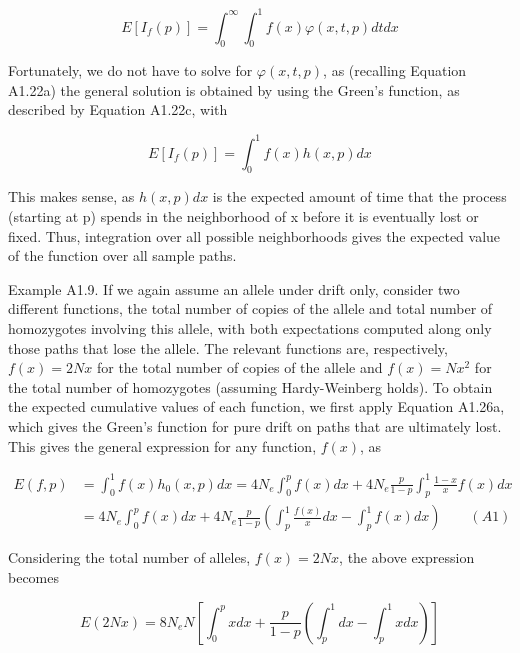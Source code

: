 \documentclass{article}
\begin{document}
\begin{equation}
E[I_{f}(p)]=\int_{0}^{\infty}\int_{0}^{1}f(x)\varphi(x,t,p)dt dx
\end{equation}

Fortunately, we do not have to solve for  $ \varphi(x,t,p) $, as (recalling Equation A1.22a) the general solution is obtained by using the Green's function, as described by Equation A1.22c, with

\begin{equation}
E[I_{f}(p)]=\int_{0}^{1}f(x)h(x,p)dx
\end{equation}

This makes sense, as  $ h(x,p)dx $ is the expected amount of time that the process (starting at p) spends in the neighborhood of x before it is eventually lost or fixed. Thus, integration over all possible neighborhoods gives the expected value of the function over all sample paths.

Example A1.9. If we again assume an allele under drift only, consider two different functions, the total number of copies of the allele and total number of homozygotes involving this allele, with both expectations computed along only those paths that lose the allele. The relevant functions are, respectively,  $ f(x) = 2Nx $ for the total number of copies of the allele and  $ f(x) = Nx^2 $ for the total number of homozygotes (assuming Hardy-Weinberg holds). To obtain the expected cumulative values of each function, we first apply Equation A1.26a, which gives the Green's function for pure drift on paths that are ultimately lost. This gives the general expression for any function,  $ f(x) $, as

\begin{equation}
\begin{aligned}E(f,p)&=\int_{0}^{1}f(x)h_{0}(x,p)dx=4N_{e}\int_{0}^{p}f(x)dx+4N_{e}\frac{p}{1-p}\int_{p}^{1}\frac{1-x}{x}f(x)dx\\&=4N_{e}\int_{0}^{p}f(x)dx+4N_{e}\frac{p}{1-p}\left(\int_{p}^{1}\frac{f(x)}{x}dx-\int_{p}^{1}f(x)dx\right)\qquad(A1)\end{aligned}
\end{equation}

Considering the total number of alleles,  $ f(x) = 2Nx $, the above expression becomes

\begin{equation}
E(2Nx)=8N_{e}N\left[\int_{0}^{p}x dx+\frac{p}{1-p}\left(\int_{p}^{1}dx-\int_{p}^{1}x dx\right)\right]
\end{equation}
\end{document}
